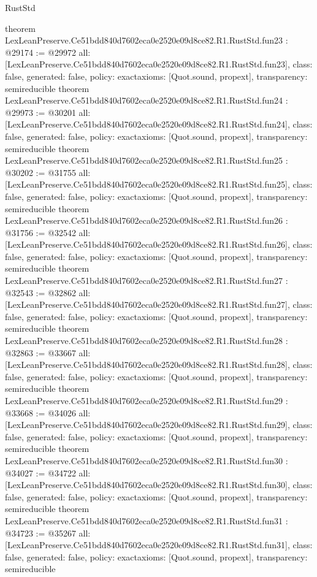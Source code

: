 \begin{lexlean}{RustStd}
\begin{coremodule}
{}
theorem LexLeanPreserve.Ce51bdd840d7602eca0e2520e09d8ce82.R1.RustStd.fun23 : @29174 := @29972 {
  all: [LexLeanPreserve.Ce51bdd840d7602eca0e2520e09d8ce82.R1.RustStd.fun23],
  class: false,
  generated: false,
  policy: exact{axioms: [Quot.sound, propext]},
  transparency: semireducible
}
theorem LexLeanPreserve.Ce51bdd840d7602eca0e2520e09d8ce82.R1.RustStd.fun24 : @29973 := @30201 {
  all: [LexLeanPreserve.Ce51bdd840d7602eca0e2520e09d8ce82.R1.RustStd.fun24],
  class: false,
  generated: false,
  policy: exact{axioms: [Quot.sound, propext]},
  transparency: semireducible
}
theorem LexLeanPreserve.Ce51bdd840d7602eca0e2520e09d8ce82.R1.RustStd.fun25 : @30202 := @31755 {
  all: [LexLeanPreserve.Ce51bdd840d7602eca0e2520e09d8ce82.R1.RustStd.fun25],
  class: false,
  generated: false,
  policy: exact{axioms: [Quot.sound, propext]},
  transparency: semireducible
}
theorem LexLeanPreserve.Ce51bdd840d7602eca0e2520e09d8ce82.R1.RustStd.fun26 : @31756 := @32542 {
  all: [LexLeanPreserve.Ce51bdd840d7602eca0e2520e09d8ce82.R1.RustStd.fun26],
  class: false,
  generated: false,
  policy: exact{axioms: [Quot.sound, propext]},
  transparency: semireducible
}
theorem LexLeanPreserve.Ce51bdd840d7602eca0e2520e09d8ce82.R1.RustStd.fun27 : @32543 := @32862 {
  all: [LexLeanPreserve.Ce51bdd840d7602eca0e2520e09d8ce82.R1.RustStd.fun27],
  class: false,
  generated: false,
  policy: exact{axioms: [Quot.sound, propext]},
  transparency: semireducible
}
theorem LexLeanPreserve.Ce51bdd840d7602eca0e2520e09d8ce82.R1.RustStd.fun28 : @32863 := @33667 {
  all: [LexLeanPreserve.Ce51bdd840d7602eca0e2520e09d8ce82.R1.RustStd.fun28],
  class: false,
  generated: false,
  policy: exact{axioms: [Quot.sound, propext]},
  transparency: semireducible
}
theorem LexLeanPreserve.Ce51bdd840d7602eca0e2520e09d8ce82.R1.RustStd.fun29 : @33668 := @34026 {
  all: [LexLeanPreserve.Ce51bdd840d7602eca0e2520e09d8ce82.R1.RustStd.fun29],
  class: false,
  generated: false,
  policy: exact{axioms: [Quot.sound, propext]},
  transparency: semireducible
}
theorem LexLeanPreserve.Ce51bdd840d7602eca0e2520e09d8ce82.R1.RustStd.fun30 : @34027 := @34722 {
  all: [LexLeanPreserve.Ce51bdd840d7602eca0e2520e09d8ce82.R1.RustStd.fun30],
  class: false,
  generated: false,
  policy: exact{axioms: [Quot.sound, propext]},
  transparency: semireducible
}
theorem LexLeanPreserve.Ce51bdd840d7602eca0e2520e09d8ce82.R1.RustStd.fun31 : @34723 := @35267 {
  all: [LexLeanPreserve.Ce51bdd840d7602eca0e2520e09d8ce82.R1.RustStd.fun31],
  class: false,
  generated: false,
  policy: exact{axioms: [Quot.sound, propext]},
  transparency: semireducible
}
\end{coremodule}
\end{lexlean}
